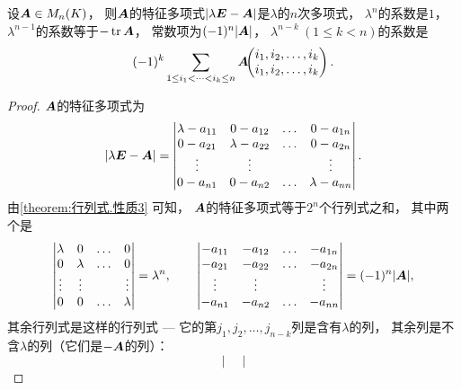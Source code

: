 \begin{proposition}\label{theorem:矩阵的特征值与特征向量.特征多项式的系数}
设\(\boldsymbol{A} \in M_n(K)\)，
则\(\boldsymbol{A}\)的特征多项式\(\abs{\lambda\boldsymbol{E}-\boldsymbol{A}}\)是\(\lambda\)的\(n\)次多项式，
\(\lambda^n\)的系数是\(1\)，
\(\lambda^{n-1}\)的系数等于\(-\tr\boldsymbol{A}\)，
常数项为\((-1)^n \abs{\boldsymbol{A}}\)，
\(\lambda^{n-k}\ (1\leq k<n)\)的系数是\begin{equation*}
	(-1)^k \sum_{1 \leq i_1 < \dotsb < i_k \leq n} \boldsymbol{A}\kern-3.8pt\begin{pmatrix}
		i_1,i_2,\dotsc,i_k \\
		i_1,i_2,\dotsc,i_k
	\end{pmatrix}.
\end{equation*}
\begin{proof}
\(\boldsymbol{A}\)的特征多项式为\begin{equation*}
	\abs{\lambda\boldsymbol{E}-\boldsymbol{A}}
	= \begin{vmatrix}
		\lambda-a_{11} & 0-a_{12} & \dots & 0-a_{1n} \\
		0-a_{21} & \lambda-a_{22} & \dots & 0-a_{2n} \\
		\vdots & \vdots && \vdots \\
		0-a_{n1} & 0-a_{n2} & \dots & \lambda-a_{nn}
	\end{vmatrix}.
\end{equation*}
由\cref{theorem:行列式.性质3} 可知，
\(\boldsymbol{A}\)的特征多项式等于\(2^n\)个行列式之和，
其中两个是\begin{equation*}
	\begin{vmatrix}
		\lambda & 0 & \dots & 0 \\
		0 & \lambda & \dots & 0 \\
		\vdots & \vdots && \vdots \\
		0 & 0 & \dots & \lambda
	\end{vmatrix}
	= \lambda^n,
	\qquad
	\begin{vmatrix}
		-a_{11} & -a_{12} & \dots & -a_{1n} \\
		-a_{21} & -a_{22} & \dots & -a_{2n} \\
		\vdots & \vdots && \vdots \\
		-a_{n1} & -a_{n2} & \dots & -a_{nn}
	\end{vmatrix}
	= (-1)^n \abs{\boldsymbol{A}},
\end{equation*}
其余行列式是这样的行列式 --- 它的第\(j_1,j_2,\dotsc,j_{n-k}\)列是含有\(\lambda\)的列，
其余列是不含\(\lambda\)的列（它们是\(-\boldsymbol{A}\)的列）：\begin{equation*}
	\begin{vmatrix}

\end{vmatrix}
\end{equation*}
\end{proof}
\end{proposition}
